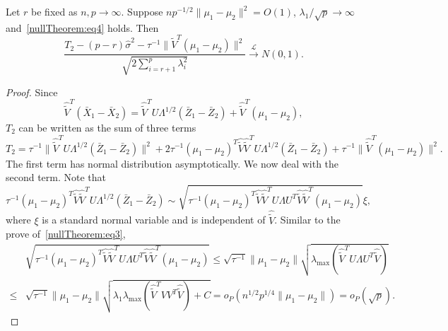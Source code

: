 \begin{theorem}
    Let $r$ be fixed as $n,p\to\infty$.
    Suppose $np^{-1/2}\|\mu_1-\mu_2\|^2=O(1)$, ${\lambda_1}/{\sqrt{p}}\to \infty$ and~\eqref{nullTheorem:eq4} holds.
    Then
        $$\frac{T_2-(p-r)\hat{\sigma}^2-\tau^{-1}\|\tilde{V}^T(\mu_1-\mu_2)\|^2}{\sqrt{2\sum_{i=r+1}^p \lambda_i^2}}\xrightarrow{\mathcal{L}}N(0,1).$$
\end{theorem}
\begin{proof}

    Since
    $$
    \hat{\tilde{V}}^T (\bar{X}_1-\bar{X}_2)=\hat{\tilde{V}}^T U \Lambda^{1/2}(\bar{Z}_1-\bar{Z}_2)+\hat{\tilde{V}}^T (\mu_1-\mu_2),
    $$
    $T_2$ can be written as the sum of three terms
    $$
    T_2=\tau^{-1}\|\hat{\tilde{V}}^T U \Lambda^{1/2}(\bar{Z}_1-\bar{Z}_2)\|^2+
 2\tau^{-1}(\mu_1-\mu_2)^T\hat{\tilde{V}}\hat{\tilde{V}}^T U \Lambda^{1/2}(\bar{Z}_1-\bar{Z}_2)
+
    \tau^{-1}\|\hat{\tilde{V}}^T (\mu_1-\mu_2)\|^2.
    $$
The first term has  normal distribution asymptotically.
    We now deal with the second term.
    Note that
    $$\tau^{-1}(\mu_1-\mu_2)^T\hat{\tilde{V}}\hat{\tilde{V}}^T U \Lambda^{1/2}(\bar{Z}_1-\bar{Z}_2)\sim
    \sqrt{\tau^{-1} (\mu_1-\mu_2)^T\hat{\tilde{V}}\hat{\tilde{V}}^T U\Lambda U^T\hat{\tilde{V}}\hat{\tilde{V}}^T(\mu_1-\mu_2)}
    \xi,
    $$
    where $\xi$ is a standard normal variable and is independent of $\hat{\tilde{V}}$.
    Similar to the prove of~\eqref{nullTheorem:eq3},
    \begin{equation}\label{buxiangxie2}
        \begin{split}
            &\sqrt{\tau^{-1} (\mu_1-\mu_2)^T\hat{\tilde{V}}\hat{\tilde{V}}^T U\Lambda U^T\hat{\tilde{V}}\hat{\tilde{V}}^T(\mu_1-\mu_2)}
    \leq
            \sqrt{\tau^{-1}} \|\mu_1-\mu_2\|    
    \sqrt{\lambda_{\max}(\hat{\tilde{V}}^T U\Lambda U^T\hat{\tilde{V}})}\\
            \leq&
            \sqrt{\tau^{-1}} \|\mu_1-\mu_2\|    
    \sqrt{\lambda_1\lambda_{\max}(\hat{\tilde{V}}^T VV^T \hat{\tilde{V}})+C}
            =o_P(n^{1/2}p^{1/4}\|\mu_1-\mu_2\|)
            = o_P(\sqrt{p}).
        \end{split}
    \end{equation}


\end{proof}
